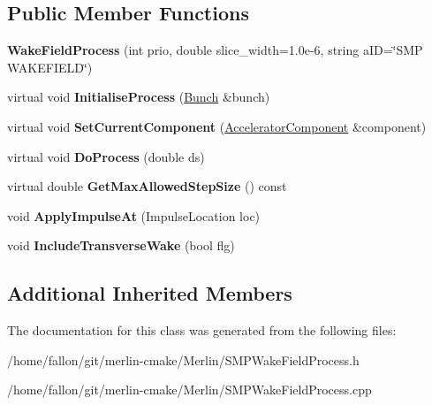 \subsection*{Public Member Functions}
\begin{DoxyCompactItemize}
\item 
\mbox{\label{classSMPTracking_1_1WakeFieldProcess_a2034cbb11c9385088ffca954095c71a6}} 
{\bfseries Wake\+Field\+Process} (int prio, double slice\+\_\+width=1.\+0e-\/6, string a\+I\+D=\char`\"{}\+S\+M\+P W\+A\+K\+E\+F\+I\+E\+L\+D\char`\"{})
\item 
\mbox{\label{classSMPTracking_1_1WakeFieldProcess_aaff6ee24c12ab7c27d8bd1509ecbf596}} 
virtual void {\bfseries Initialise\+Process} (\hyperlink{classBunch}{Bunch} \&bunch)
\item 
\mbox{\label{classSMPTracking_1_1WakeFieldProcess_a224872c661dc95f216a0bf0333f1269b}} 
virtual void {\bfseries Set\+Current\+Component} (\hyperlink{classAcceleratorComponent}{Accelerator\+Component} \&component)
\item 
\mbox{\label{classSMPTracking_1_1WakeFieldProcess_a2ccfffd3a85f474ef01df309d25dd024}} 
virtual void {\bfseries Do\+Process} (double ds)
\item 
\mbox{\label{classSMPTracking_1_1WakeFieldProcess_a7a2c5c56af74932049abe7a34a0d47d3}} 
virtual double {\bfseries Get\+Max\+Allowed\+Step\+Size} () const
\item 
\mbox{\label{classSMPTracking_1_1WakeFieldProcess_a6a16e9ff93dfd8d90bd6ac2ff80c6fba}} 
void {\bfseries Apply\+Impulse\+At} (Impulse\+Location loc)
\item 
\mbox{\label{classSMPTracking_1_1WakeFieldProcess_a13a679309a25176cde41abf341779804}} 
void {\bfseries Include\+Transverse\+Wake} (bool flg)
\end{DoxyCompactItemize}
\subsection*{Additional Inherited Members}


The documentation for this class was generated from the following files\+:\begin{DoxyCompactItemize}
\item 
/home/fallon/git/merlin-\/cmake/\+Merlin/S\+M\+P\+Wake\+Field\+Process.\+h\item 
/home/fallon/git/merlin-\/cmake/\+Merlin/S\+M\+P\+Wake\+Field\+Process.\+cpp\end{DoxyCompactItemize}
